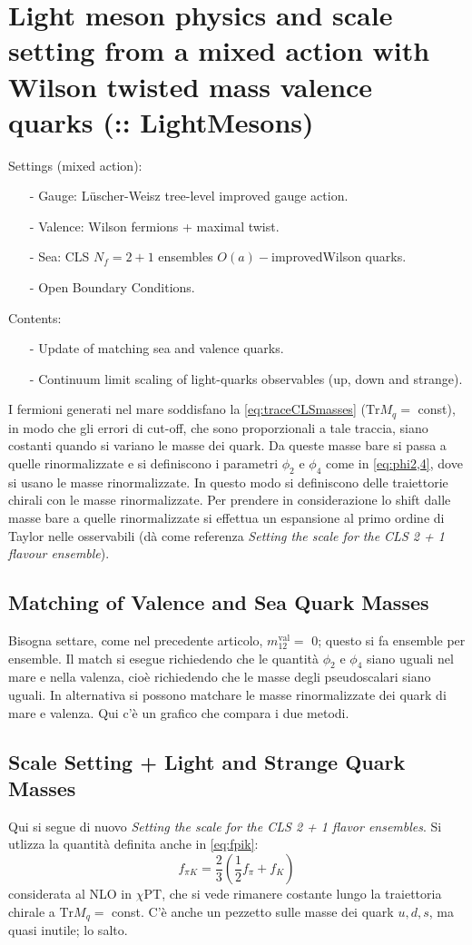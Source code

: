 \documentclass[12pt,a4paper,openright]{article}
\newcommand{\colg}{\textcolor{PineGreen}}
\newcommand{\cpt}{$\chi\text{PT}$}
\newcommand{\oai}{$O(a)-$improved}
\newcommand{\obc}{Open Boundary Conditions}
\newcommand{\tr}{\text{Tr}}
\begin{document}
\section{Light meson physics and scale setting from a mixed action with Wilson twisted mass valence quarks (:: LightMesons)}
Settings (mixed action):
\begin{itemize}
  \item [-] Gauge: Lüscher-Weisz tree-level improved gauge action.
  \item [-] Valence: Wilson fermions + maximal twist.
  \item [-] Sea: CLS $N_f = 2+1$ ensembles \oai Wilson quarks.
  \item [-] \obc.
\end{itemize}
Contents:
\begin{itemize}
  \item [-] Update of matching sea and valence quarks.
  \item [-] Continuum limit scaling of light-quarks observables (up, down and strange).
\end{itemize}
I fermioni generati nel mare soddisfano la \ref{eq:traceCLSmasses} ($\tr M_q = $ const), in modo che gli errori di cut-off, che sono proporzionali a tale traccia, siano costanti quando si variano le masse dei quark.
Da queste masse bare si passa a quelle rinormalizzate e si definiscono i parametri $\phi_2$ e $\phi_4$ come in \ref{eq:phi2,4}, dove si usano le masse rinormalizzate.
In questo modo si definiscono delle traiettorie chirali con le masse rinormalizzate.
Per prendere in considerazione lo shift dalle masse bare a quelle rinormalizzate si effettua un espansione al primo ordine di Taylor nelle osservabili (dà come referenza \textit{Setting the scale for the CLS 2 + 1 flavour ensemble}).

\subsection{Matching of Valence and Sea Quark Masses}
Bisogna settare, come nel precedente articolo, $m_{12}^\text{val}=$ 0; questo si fa ensemble per ensemble.
Il match si esegue richiedendo che le quantità $\phi_2$ e $\phi_4$ siano uguali nel mare e nella valenza, cioè richiedendo che le masse degli pseudoscalari siano uguali.
In alternativa si possono matchare le masse rinormalizzate dei quark di mare e valenza. \colg{Qui c'è un grafico che compara i due metodi}.

\subsection{Scale Setting + Light and Strange Quark Masses}
Qui si segue di nuovo \textit{Setting the scale for the CLS 2 + 1 flavor ensembles}.
Si utlizza la quantità definita anche in \ref{eq:fpik}:
\begin{equation*}
  f_{\pi K} = \frac{2}{3} \left(\frac{1}{2}f_\pi + f_K\right)
\end{equation*}
considerata al NLO in \cpt, che si vede rimanere costante lungo la traiettoria chirale a $\tr M_q =$ const.
\newline
C'è anche un pezzetto sulle masse dei quark $u,d,s$, ma quasi inutile; lo salto. 
\end{document}
